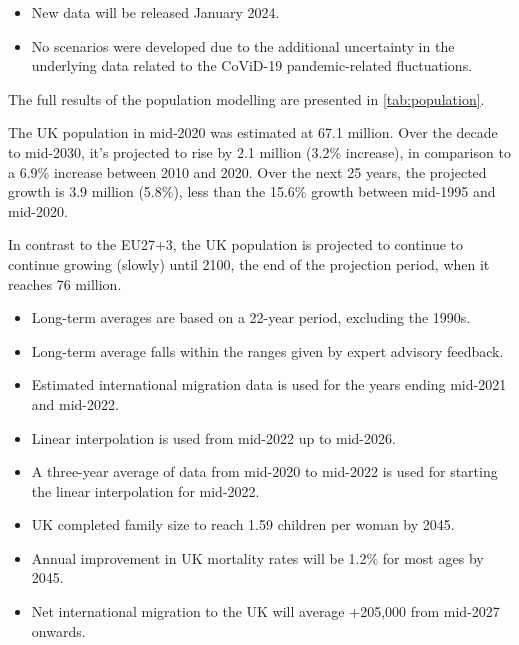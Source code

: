 \begin{itemize}
      \item New data will be released January 2024.
      \item No scenarios were developed due to the additional uncertainty in the underlying
            data related to the CoViD-19 pandemic-related fluctuations.
\end{itemize}


The full results of the population modelling are presented in
\autoref{tab:population}.


The UK population in mid-2020 was estimated at 67.1 million. Over the decade to
mid-2030, it's projected to rise by 2.1 million (3.2\% increase), in comparison
to a 6.9\% increase between 2010 and 2020. Over the next 25 years, the
projected growth is 3.9 million (5.8\%), less than the 15.6\% growth between
mid-1995 and mid-2020.

In contrast to the EU27+3, the UK population is projected to continue to
continue growing (slowly) until 2100, the end of the projection period, when it
reaches 76 million.

\begin{itemize}
      \item Long-term averages are based on a 22-year period, excluding the 1990s.
      \item Long-term average falls within the ranges given by expert advisory feedback.
      \item Estimated international migration data is used for the years ending mid-2021
            and mid-2022.
      \item Linear interpolation is used from mid-2022 up to mid-2026.
      \item A three-year average of data from mid-2020 to mid-2022 is used for starting the
            linear interpolation for mid-2022.
      \item UK completed family size to reach 1.59 children per woman by 2045.
      \item Annual improvement in UK mortality rates will be 1.2\% for most ages by 2045.
      \item Net international migration to the UK will average +205,000 from mid-2027
            onwards.
\end{itemize}

